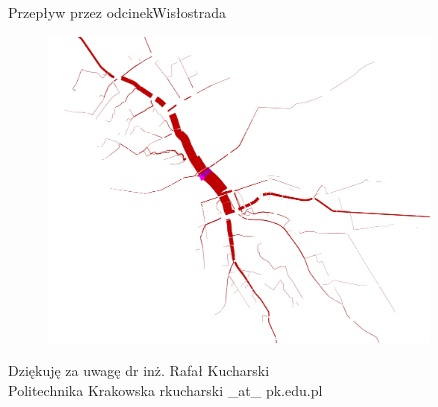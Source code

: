 \documentclass[8pt]{beamer}
\begin{document}
\begin{frame}{Przepływ przez odcinek}{Wisłostrada}
\begin{figure}\begin{center}
\includegraphics[width=0.9\textwidth]{bundle_link}
 \end{center}  \end{figure} 
\end{frame}

\begin{frame}{Dziękuję za uwagę}
dr inż. Rafał Kucharski \\
Politechnika Krakowska
rkucharski _at_ pk.edu.pl
\end{frame}
\end{document}
